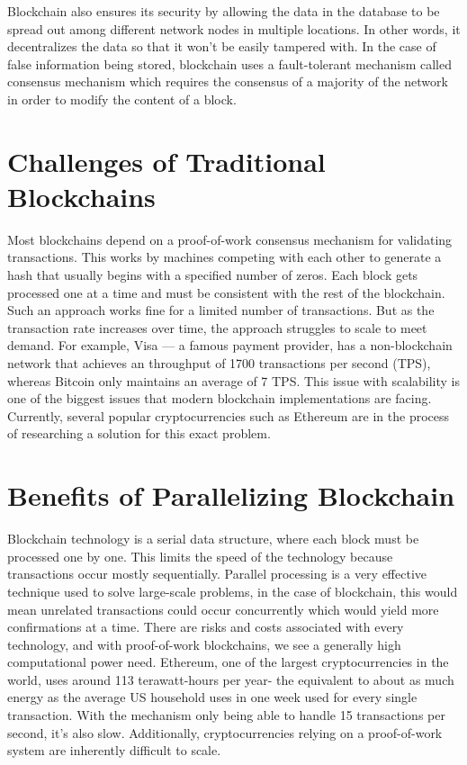 Blockchain also ensures its security by allowing the data in the database to be spread out among different network nodes in multiple locations. In other words, it decentralizes the data so that it won’t be easily tampered with. In the case of false information being stored, blockchain uses a fault-tolerant mechanism called consensus mechanism 
which requires the consensus of a majority of the network in order to modify the content of a block.

\section{Challenges of Traditional Blockchains}

Most blockchains depend on a proof-of-work consensus mechanism for validating transactions. This works by machines competing with each other to generate a hash that usually begins with a specified number of zeros. Each block gets processed one at a time and must be consistent with the rest of the blockchain. Such an approach works fine for a limited number of transactions. But as the transaction rate increases over time, the approach struggles to scale to meet demand. For example, Visa — a famous payment provider, has a non-blockchain network that achieves an throughput of 1700 transactions per second (TPS), whereas Bitcoin only maintains an average of 7 TPS. This issue with scalability is one of the biggest issues that modern blockchain implementations are facing. Currently, several popular cryptocurrencies such as Ethereum are in the process of researching a solution for this exact problem.

\section{Benefits of Parallelizing Blockchain}

Blockchain technology is a serial data structure, where each block must be processed one by one. This limits the speed of the technology because transactions occur mostly sequentially. Parallel processing is a very effective technique used to solve large-scale problems, in the case of blockchain, this would mean unrelated transactions could occur concurrently which would yield more confirmations at a time. 
There are risks and costs associated with every technology, and with proof-of-work blockchains, we see a generally high computational power need. Ethereum, one of the largest cryptocurrencies in the world, uses around 113 terawatt-hours per year- the equivalent to about as much energy as the average US household uses in one week used for every single transaction. With the mechanism only being able to handle 15 transactions per second, it’s also slow. Additionally, cryptocurrencies relying on a proof-of-work system are inherently difficult to scale.

